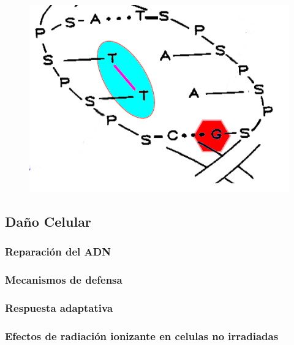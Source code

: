 \begin{figure}[htbp]
    \centering
    \includegraphics[width=0.5\linewidth]{./Figures/base-piri.png}
    \caption[Esquema Daño base y Dimeridos]{}
    \label{fig:esbdb}
\end{figure}

\subsection{Daño Celular}
\subsubsection{Reparación del ADN}
\subsubsection{Mecanismos de defensa}
\subsubsection{Respuesta adaptativa}
\subsubsection{Efectos de radiación ionizante en celulas no irradiadas}
\cite{willmari}
